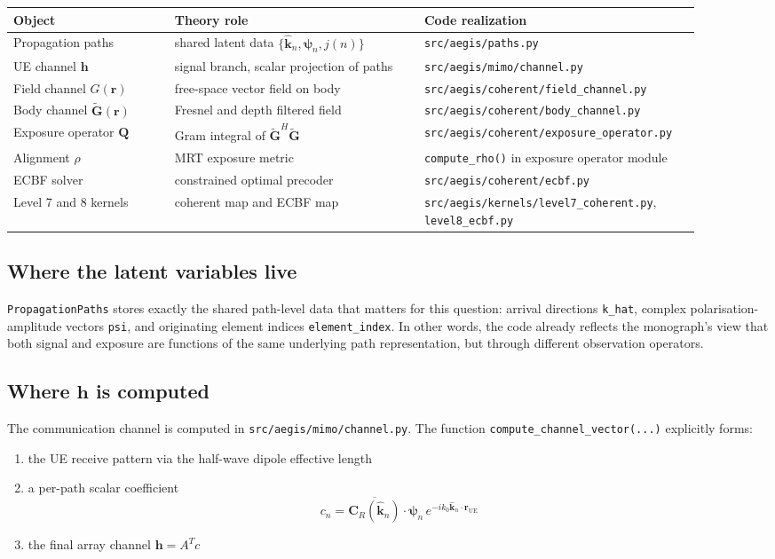 \documentclass[11pt]{article}
\newcommand{\hh}{\mathbf{h}}
\newcommand{\QQ}{\mathbf{Q}}
\newcommand{\Gh}{\widetilde{\mathbf{G}}}
\begin{document}
\begin{center}
\begin{tabular}{p{0.22\linewidth} p{0.34\linewidth} p{0.34\linewidth}}
\toprule
Object & Theory role & Code realization \\
\midrule
Propagation paths & shared latent data
$\{ \hat{\mathbf{k}}_n,\boldsymbol{\psi}_n,j(n)\}$ &
\texttt{src/aegis/paths.py} \\
UE channel $\hh$ & signal branch, scalar projection of paths &
\texttt{src/aegis/mimo/channel.py} \\
Field channel $G(\mathbf{r})$ & free-space vector field on body &
\texttt{src/aegis/coherent/field\_channel.py} \\
Body channel $\Gh(\mathbf{r})$ & Fresnel and depth filtered field &
\texttt{src/aegis/coherent/body\_channel.py} \\
Exposure operator $\QQ$ & Gram integral of $\Gh^H\Gh$ &
\texttt{src/aegis/coherent/exposure\_operator.py} \\
Alignment $\rho$ & MRT exposure metric &
\texttt{compute\_rho()} in exposure operator module \\
ECBF solver & constrained optimal precoder &
\texttt{src/aegis/coherent/ecbf.py} \\
Level 7 and 8 kernels & coherent map and ECBF map &
\texttt{src/aegis/kernels/level7\_coherent.py},
\texttt{level8\_ecbf.py} \\
\bottomrule
\end{tabular}
\end{center}

\subsection*{Where the latent variables live}

\texttt{PropagationPaths} stores exactly the shared path-level data that
matters for this question: arrival directions \texttt{k\_hat}, complex
polarisation-amplitude vectors \texttt{psi}, and originating element indices
\texttt{element\_index}. In other words, the code already reflects the
monograph's view that both signal and exposure are functions of the same
underlying path representation, but through different observation operators.

\subsection*{Where $\hh$ is computed}

The communication channel is computed in
\texttt{src/aegis/mimo/channel.py}. The function
\texttt{compute\_channel\_vector(...)} explicitly forms:
\begin{enumerate}
  \item the UE receive pattern via the half-wave dipole effective length
  \item a per-path scalar coefficient
  \[
    c_n = \overline{\mathbf{C}_R(\hat{\mathbf{k}}_n)} \cdot
    \boldsymbol{\psi}_n\,
    e^{-ik_0\hat{\mathbf{k}}_n\cdot \mathbf{r}_{\mathrm{UE}}}
  \]
  \item the final array channel $\hh = A^T c$
\end{enumerate}
\end{document}
